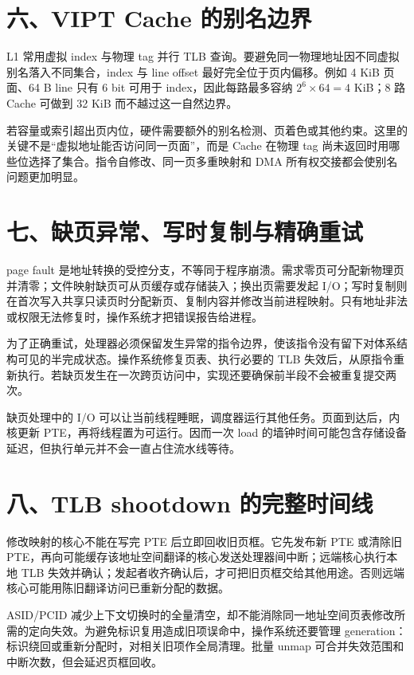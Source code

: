 \section{六、VIPT Cache 的别名边界}

L1 常用虚拟 index 与物理 tag 并行 TLB 查询。要避免同一物理地址因不同虚拟别名落入不同集合，index 与 line offset 最好完全位于页内偏移。例如 4 KiB 页面、64 B line 只有 6 bit 可用于 index，因此每路最多容纳 $2^6\times64=4$ KiB；8 路 Cache 可做到 32 KiB 而不越过这一自然边界。

若容量或索引超出页内位，硬件需要额外的别名检测、页着色或其他约束。这里的关键不是“虚拟地址能否访问同一页面”，而是 Cache 在物理 tag 尚未返回时用哪些位选择了集合。指令自修改、同一页多重映射和 DMA 所有权交接都会使别名问题更加明显。

\section{七、缺页异常、写时复制与精确重试}

page fault 是地址转换的受控分支，不等同于程序崩溃。需求零页可分配新物理页并清零；文件映射缺页可从页缓存或存储装入；换出页需要发起 I/O；写时复制则在首次写入共享只读页时分配新页、复制内容并修改当前进程映射。只有地址非法或权限无法修复时，操作系统才把错误报告给进程。

为了正确重试，处理器必须保留发生异常的指令边界，使该指令没有留下对体系结构可见的半完成状态。操作系统修复页表、执行必要的 TLB 失效后，从原指令重新执行。若缺页发生在一次跨页访问中，实现还要确保前半段不会被重复提交两次。

缺页处理中的 I/O 可以让当前线程睡眠，调度器运行其他任务。页面到达后，内核更新 PTE，再将线程置为可运行。因而一次 load 的墙钟时间可能包含存储设备延迟，但执行单元并不会一直占住流水线等待。

\section{八、TLB shootdown 的完整时间线}

修改映射的核心不能在写完 PTE 后立即回收旧页框。它先发布新 PTE 或清除旧 PTE，再向可能缓存该地址空间翻译的核心发送处理器间中断；远端核心执行本地 TLB 失效并确认；发起者收齐确认后，才可把旧页框交给其他用途。否则远端核心可能用陈旧翻译访问已重新分配的数据。

ASID/PCID 减少上下文切换时的全量清空，却不能消除同一地址空间页表修改所需的定向失效。为避免标识复用造成旧项误命中，操作系统还要管理 generation：标识绕回或重新分配时，对相关旧项作全局清理。批量 unmap 可合并失效范围和中断次数，但会延迟页框回收。

